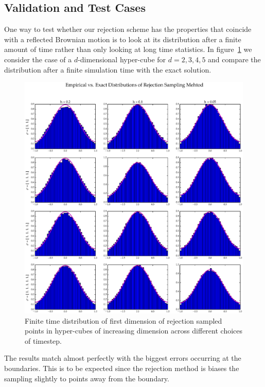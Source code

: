 
\subsection{Validation and Test Cases}

One way to test whether our rejection scheme has the properties that coincide with a reflected Brownian motion is to look at its distribution after a finite amount of time rather than only looking at long time statistics. In figure~\ref{fig:HCFin} we consider the case of a $d$-dimensional hyper-cube for $d = 2, 3, 4, 5$  and compare the distribution after a finite simulation time with the exact solution. 
\begin{figure}[ht]
\centering
  \includegraphics[scale=0.4, angle=0]{images/rejection_finite.eps}
\caption{Finite time distribution of first dimension of rejection sampled points in hyper-cubes of increasing dimension across different choices of timestep.}
\label{fig:HCFin}
\end{figure}
The results match almost perfectly with the biggest errors occurring at the boundaries. This is to be expected since the rejection method is biases the sampling slightly to points away from the boundary. 

